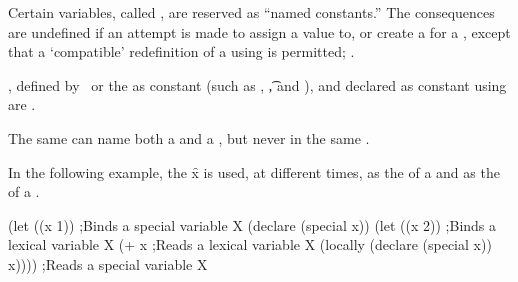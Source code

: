 
\endsubsubsubsubsection%


Certain variables, called , are reserved as ``named constants.''  
The consequences are undefined if an attempt is made to 
    assign a value to,
 or create
a  for a , 
except that a `compatible' redefinition of a 
using  is permitted; .

, 
 defined by \clisp\ or the 
  as constant (such as \nil, \t, and ),
and  declared as constant using 
are .

\endsubsubsubsubsection%



The same  can name both 
    a  
and a ,
but never in the same .

In the following example, the  \f{x} is used,
at different times, 
    as the  of a 
and as the  of a .
 
\code
 (let ((x 1))            ;Binds a special variable X
   (declare (special x))
   (let ((x 2))          ;Binds a lexical variable X
     (+ x                ;Reads a lexical variable X
        (locally (declare (special x))
                 x))))   ;Reads a special variable X
\endcode

\endsubsubsubsubsection%

\endsubsubsubsection%


